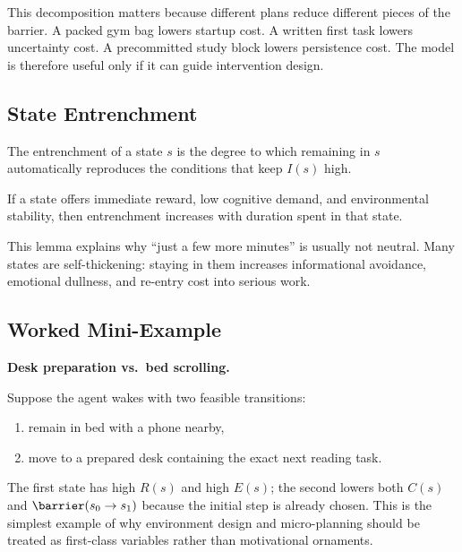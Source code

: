 \begin{discussion}
This decomposition matters because different plans reduce different pieces of
the barrier. A packed gym bag lowers startup cost. A written first task lowers
uncertainty cost. A precommitted study block lowers persistence cost. The model
is therefore useful only if it can guide intervention design.
\end{discussion}

\subsection{State Entrenchment}

\begin{definition}[Entrenchment]
The entrenchment of a state $s$ is the degree to which remaining in $s$
automatically reproduces the conditions that keep $I(s)$ high.
\end{definition}

\begin{lemma}
If a state offers immediate reward, low cognitive demand, and environmental
stability, then entrenchment increases with duration spent in that state.
\end{lemma}

\begin{discussion}
This lemma explains why ``just a few more minutes'' is usually not neutral.
Many states are self-thickening: staying in them increases informational
avoidance, emotional dullness, and re-entry cost into serious work.
\end{discussion}

\subsection{Worked Mini-Example}

\begin{examplebox}
\textbf{Desk preparation vs.\ bed scrolling.}

Suppose the agent wakes with two feasible transitions:
\begin{enumerate}[nosep]
  \item remain in bed with a phone nearby,
  \item move to a prepared desk containing the exact next reading task.
\end{enumerate}
The first state has high $R(s)$ and high $E(s)$; the second lowers both
$C(s)$ and $\barrier(s_0 \to s_1)$ because the initial step is already chosen.
This is the simplest example of why environment design and micro-planning
should be treated as first-class variables rather than motivational ornaments.
\end{examplebox}

